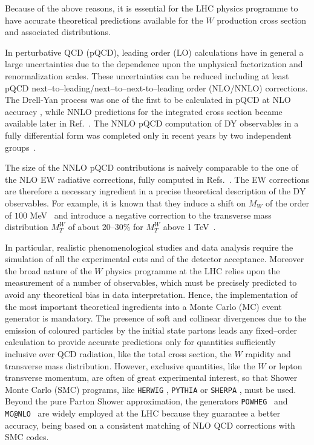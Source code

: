 \documentclass[11pt,a4paper]{article}
\begin{document}
Because of the above reasons, it is essential for the LHC physics programme to have accurate 
theoretical predictions available for the $W$ production cross section and associated distributions. 

In perturbative QCD (pQCD), leading order (LO) calculations have in general a large 
uncertainties due to the dependence upon the unphysical factorization %
and renormalization scales. %
These uncertainties can be reduced including at least pQCD next--to--leading/next--to--next-to--leading order 
(NLO/NNLO) corrections. The Drell-Yan process was one of the first to be 
calculated in  pQCD at NLO accuracy \cite{Altarelli:1979ub}, 
while NNLO predictions for the integrated cross section became available
later in Ref.~\cite{Hamberg:1990np}.
The NNLO pQCD computation of DY observables in a fully differential form
was completed only in recent years by two 
independent groups~\cite{Anastasiou:2003yy,melnikov:2006kv, Catani:2009sm}.

The size of the NNLO pQCD contributions is naively comparable to the one of the NLO EW 
radiative corrections, fully computed in Refs.~\cite{Dittmaier:2001ay,Zykunov:2006yb,Baur:2004ig,
Arbuzov:2005dd,CarloniCalame:2006zq}. The EW corrections are therefore a 
necessary ingredient in a precise theoretical description of the DY observables. 
For example, it is known that they induce a shift on $M_W$ of the order of $100$ MeV~\cite{CarloniCalame:2003ux}
and introduce a negative correction to the transverse mass distribution $M_T^W$ of about 20--30\% for
$M_T^W$ above 1 TeV~\cite{CarloniCalame:2006zq}.

In particular, realistic phenomenological studies and data analysis require the simulation of all the 
experimental cuts and of the detector acceptance. Moreover the 
broad nature of the $W$ physics programme at the LHC relies upon the measurement of 
a number of observables, which must be precisely predicted to avoid any theoretical bias in data interpretation. Hence, the 
implementation of the most important theoretical ingredients into a  Monte Carlo (MC)
event generator is mandatory. The presence of soft and collinear divergences due to the emission 
of coloured particles by the initial state partons leads any fixed--order calculation to provide accurate predictions only for 
quantities sufficiently inclusive over QCD radiation, like the total cross section, the $W$ rapidity and 
transverse mass distribution. However, exclusive quantities, like the $W$ or lepton transverse momentum, are often of great experimental interest,
so that Shower Monte Carlo (SMC) programs, like \texttt{HERWIG} \cite{Corcella:2002jc}, 
\texttt{PYTHIA} \cite{Sjostrand:2007gs} or 
\texttt{SHERPA} \cite{Gleisberg:2008ta}, must be used. Beyond the pure Parton Shower approximation, 
the generators \texttt{POWHEG}~\cite{Nason:2004rx,Frixione:2007vw} 
and \texttt{MC@NLO}~\cite{Frixione:2002ik} are widely employed at the LHC because they guarantee a 
better accuracy, being based on a 
consistent matching of NLO QCD corrections with SMC codes.
\end{document}
